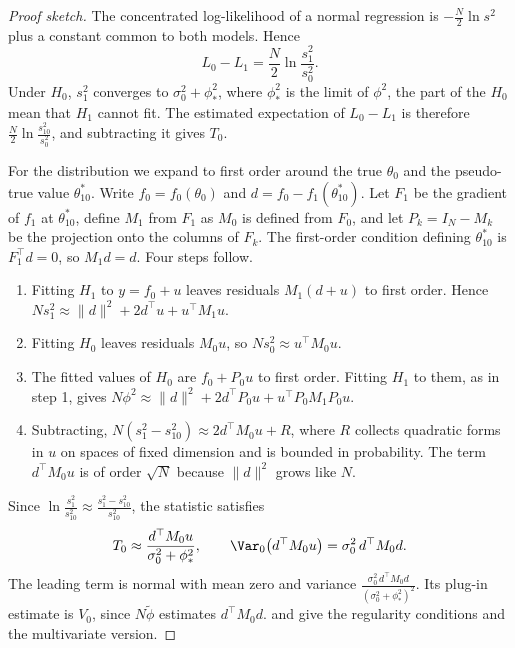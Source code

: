 \begin{proof}[Proof sketch]
The concentrated log-likelihood of a normal regression is $-\frac{N}{2}\ln s^2$ plus a constant common to both
models. Hence
\begin{equation*}
  L_0 - L_1 = \frac{N}{2}\ln\frac{s_1^2}{s_0^2}.
\end{equation*}
Under $H_0$, $s_1^2$ converges to $\sigma_0^2 + \phi_*^2$, where $\phi_*^2$ is the limit of $\phi^2$, the part of the
$H_0$ mean that $H_1$ cannot fit. The estimated expectation of $L_0 - L_1$ is therefore
$\frac{N}{2}\ln\frac{s_{10}^2}{s_0^2}$, and subtracting it gives $T_0$.

For the distribution we expand to first order around the true $\theta_0$ and the pseudo-true value
$\theta_{10}^*$. Write $f_0 = f_0(\theta_0)$ and $d = f_0 - f_1(\theta_{10}^*)$. Let $F_1$ be the gradient of $f_1$ at
$\theta_{10}^*$, define $M_1$ from $F_1$ as $M_0$ is defined from $F_0$, and let $P_k = I_N - M_k$ be the projection
onto the columns of $F_k$. The first-order condition
defining $\theta_{10}^*$ is $F_1^\top d = 0$, so $M_1d = d$. Four steps follow.
\begin{enumerate}
\item Fitting $H_1$ to $y = f_0 + u$ leaves residuals $M_1(d + u)$ to first order. Hence
$Ns_1^2 \approx \|d\|^2 + 2d^\top u + u^\top M_1 u$.
\item Fitting $H_0$ leaves residuals $M_0u$, so $Ns_0^2 \approx u^\top M_0 u$.
\item The fitted values of $H_0$ are $f_0 + P_0u$ to first order. Fitting $H_1$ to them, as in step 1, gives
$N\phi^2 \approx \|d\|^2 + 2d^\top P_0u + u^\top P_0M_1P_0u$.
\item Subtracting, $N(s_1^2 - s_{10}^2) \approx 2d^\top M_0 u + R$, where $R$ collects quadratic forms in $u$ on spaces of
fixed dimension and is bounded in probability. The term $d^\top M_0u$ is of order $\sqrt N$ because
$\|d\|^2$ grows like $N$.
\end{enumerate}
Since $\ln\frac{s_1^2}{s_{10}^2} \approx \frac{s_1^2 - s_{10}^2}{s_{10}^2}$, the statistic satisfies
\begin{equation*}
  T_0 \approx \frac{d^\top M_0u}{\sigma_0^2 + \phi_*^2},
  \qquad
  \Var_0\bigl(d^\top M_0 u\bigr) = \sigma_0^2\, d^\top M_0 d .
\end{equation*}
The leading term is normal with mean zero and variance $\frac{\sigma_0^2\, d^\top M_0 d}{(\sigma_0^2 + \phi_*^2)^2}$. Its
plug-in estimate is $V_0$, since $N\tilde\phi$ estimates $d^\top M_0d$. \citet{Pesaran1974} and
\citet{PesaranDeaton1978} give the regularity conditions and the multivariate version.
\end{proof}

